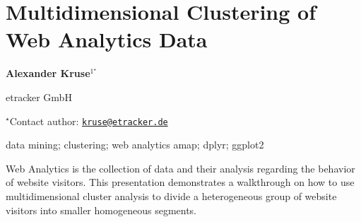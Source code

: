 \documentclass[\main/boa.tex]{subfiles}
\begin{document}
\section{Multidimensional Clustering of Web Analytics Data}

\begin{center}
  {\bf {} Alexander Kruse$^{1^\star}$}
\end{center}

\vskip 0.3cm

\begin{affiliations}
\begin{enumerate}
\begin{minipage}{0.915\textwidth}
\centering
\item etracker GmbH \\[-2pt]
\end{minipage}
\end{enumerate}
$^\star$Contact author: \href{mailto:kruse@etracker.de}{\nolinkurl{kruse@etracker.de}}\\
\end{affiliations}

\vskip 0.5cm

\begin{minipage}{0.915\textwidth}
\keywords data mining; clustering; web analytics
\packages amap; dplyr; ggplot2
\end{minipage}

\vskip 0.8cm

Web Analytics is the collection of data and their analysis regarding the
behavior of website visitors. This presentation demonstrates a
walkthrough on how to use multidimensional cluster analysis to divide a
heterogeneous group of website visitors into smaller homogeneous
segments.
\end{document}
